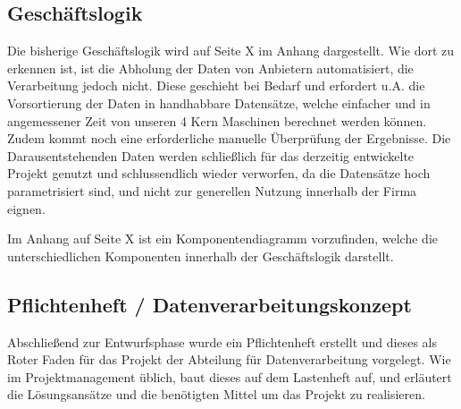 \subsection{Geschäftslogik}
Die bisherige Geschäftslogik wird auf Seite X im Anhang dargestellt. Wie dort zu erkennen ist,
ist die Abholung der Daten von Anbietern automatisiert, die Verarbeitung jedoch nicht.
Diese geschieht bei Bedarf und erfordert u.A. die Vorsortierung der Daten in handhabbare
Datensätze, welche einfacher und in angemessener Zeit von unseren 4 Kern Maschinen
berechnet werden können. Zudem kommt noch eine erforderliche manuelle Überprüfung
der Ergebnisse. Die Darausentstehenden Daten werden schließlich für das derzeitig entwickelte Projekt
genutzt und schlussendlich wieder verworfen, da die Datensätze hoch parametrisiert sind,
und nicht zur generellen Nutzung innerhalb der Firma eignen.\par

Im Anhang auf Seite X ist ein Komponentendiagramm vorzufinden, welche die
unterschiedlichen Komponenten innerhalb der Geschäftslogik darstellt.

\subsection{Pflichtenheft / Datenverarbeitungskonzept}
Abschließend zur Entwurfsphase wurde ein Pflichtenheft erstellt und dieses als
Roter Faden für das Projekt der Abteilung für Datenverarbeitung vorgelegt. Wie im
Projektmanagement üblich, baut dieses auf dem Lastenheft auf, und erläutert die
Lösungsansätze und die benötigten Mittel um das Projekt zu realisieren.
